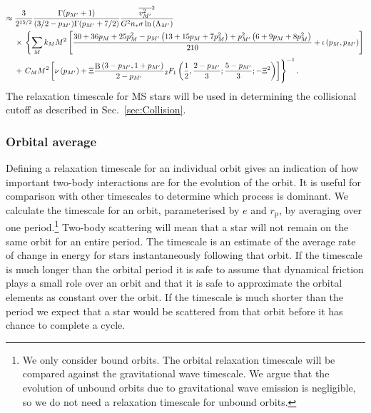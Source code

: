 \documentclass[useAMS,usedcolumn,usegraphicx,usenatbib]{mn2e}
\newcommand{\secref}[1]{Sec.~\ref{sec:#1}}
\DeclareMathOperator{\Beta}{B}
\newcommand{\sub}[1]{\ensuremath{_\mathrm{#1}}}
\newcommand{\recip}[1]{\ensuremath{\dfrac{1}{#1}}}
\begin{document}
\begin{onecolumn}
\begin{align}
 \approx {} & \frac{3}{2^{15/2}}\frac{\Gamma(p_{M'} + 1)}{(3/2 - p_{M'})\Gamma(p_{M'} + 7/2)}\frac{\overline{v_{M'}^2}^2}{G^2n_\ast\sigma\ln\left(\Lambda_{M'}\right)} \nonumber \\* 
  & \times {} \left\{\sum_M k_M M^2 \left[ \frac{30 + 36p_M + 25p_M^2 - p_{M'}\left(13 + 15p_M + 7 p_M^2\right) + p_{M'}^2\left(6 + 9p_M + 8p_M^2\right)}{210} + \iota \left(p_M,p_{M'}\right)\right] \right. \nonumber \\*
  & + \left. \vphantom{ \left[ \frac{p_{M'}^2\left(6 + 9p_M + 8p_M^2\right)}{210}\right]} C_M M^2 \left[\nu\left(p_{M'}\right) + \Xi\frac{\Beta\left(3-p_{M'},1+p_{M'}\right)}{2-p_{M'}}{_2F_1}\left(\recip{2},\frac{2-p_{M'}}{3};\frac{5-p_{M'}}{3};-\Xi^2\right)\right]\right\}^{-1}.
\end{align}
The relaxation timescale for MS stars will be used in determining the collisional cutoff as described in \secref{Collision}.

\subsubsection{Orbital average}

Defining a relaxation timescale for an individual orbit gives an indication of how important two-body interactions are for the evolution of the orbit. It is useful for comparison with other timescales to determine which process is dominant. We calculate the timescale for an orbit, parameterised by $e$ and $r\sub{p}$, by averaging over one period.\footnote{We only consider bound orbits. The orbital relaxation timescale will be compared against the gravitational wave timescale. We argue that the evolution of unbound orbits due to gravitational wave emission is negligible, so we do not need a relaxation timescale for unbound orbits.}  Two-body scattering will mean that a star will not remain on the same orbit for an entire period. The timescale is an estimate of the average rate of change in energy for stars instantaneously following that orbit. If the timescale is much longer than the orbital period it is safe to assume that dynamical friction plays a small role over an orbit and that it is safe to approximate the orbital elements as constant over the orbit. If the timescale is much shorter than the period we expect that a star would be scattered from that orbit before it has chance to complete a cycle.


\end{onecolumn}
\end{document}

